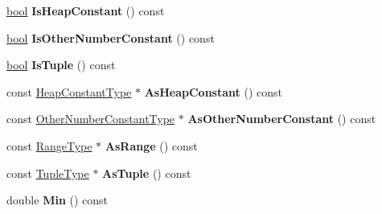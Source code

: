 \begin{DoxyCompactItemize}
\mbox{\hyperlink{classbool}{bool}} {\bfseries Is\+Heap\+Constant} () const
\item 
\mbox{\label{classv8_1_1internal_1_1compiler_1_1Type_af46739b58cdd2f22c5b0c9c7d9de33f6}} 
\mbox{\hyperlink{classbool}{bool}} {\bfseries Is\+Other\+Number\+Constant} () const
\item 
\mbox{\label{classv8_1_1internal_1_1compiler_1_1Type_a54e173829c18bd689015266bb7973d37}} 
\mbox{\hyperlink{classbool}{bool}} {\bfseries Is\+Tuple} () const
\item 
\mbox{\label{classv8_1_1internal_1_1compiler_1_1Type_a768edff88d403265ae14d745346c31f1}} 
const \mbox{\hyperlink{classv8_1_1internal_1_1compiler_1_1HeapConstantType}{Heap\+Constant\+Type}} $\ast$ {\bfseries As\+Heap\+Constant} () const
\item 
\mbox{\label{classv8_1_1internal_1_1compiler_1_1Type_a60271541caed9a698c22def296916d72}} 
const \mbox{\hyperlink{classv8_1_1internal_1_1compiler_1_1OtherNumberConstantType}{Other\+Number\+Constant\+Type}} $\ast$ {\bfseries As\+Other\+Number\+Constant} () const
\item 
\mbox{\label{classv8_1_1internal_1_1compiler_1_1Type_acc807775534778eaca7bc1c0029ee159}} 
const \mbox{\hyperlink{classv8_1_1internal_1_1compiler_1_1RangeType}{Range\+Type}} $\ast$ {\bfseries As\+Range} () const
\item 
\mbox{\label{classv8_1_1internal_1_1compiler_1_1Type_a7e368772256083a6239a2ee792909c44}} 
const \mbox{\hyperlink{classv8_1_1internal_1_1compiler_1_1TupleType}{Tuple\+Type}} $\ast$ {\bfseries As\+Tuple} () const
\item 
\mbox{\label{classv8_1_1internal_1_1compiler_1_1Type_aaa073ddd28f3f3eebed707986d5c1952}} 
double {\bfseries Min} () const
\item 
\mbox{\label{classv8_1_1internal_1_1compiler_1_1Type_a2bcebcb959da52bb7bcf940e21a8aff9}} 

\end{DoxyCompactItemize}
